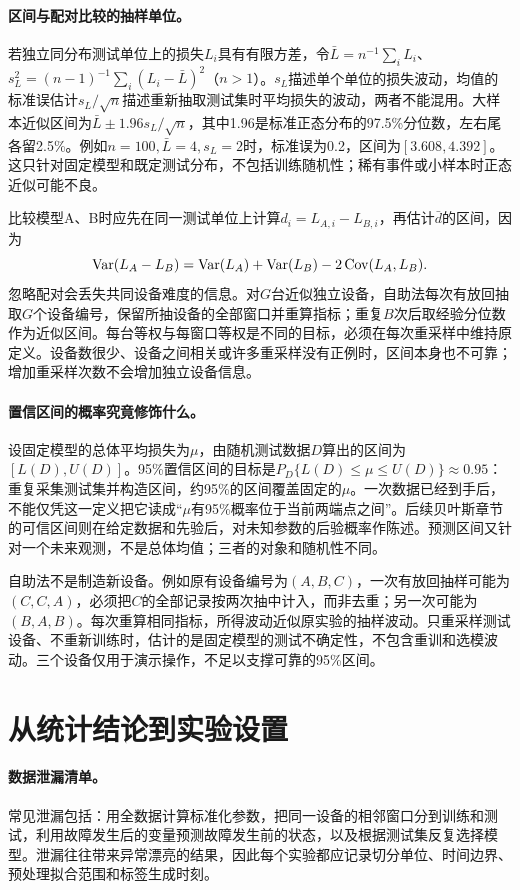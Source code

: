 \paragraph{区间与配对比较的抽样单位。}
若独立同分布测试单位上的损失$L_i$具有有限方差，令$\bar L=n^{-1}\sum_iL_i$、$s_L^2=(n-1)^{-1}\sum_i(L_i-\bar L)^2$（$n>1$）。$s_L$描述单个单位的损失波动，均值的标准误估计$s_L/\sqrt n$描述重新抽取测试集时平均损失的波动，两者不能混用。大样本近似区间为$\bar L\pm1.96s_L/\sqrt n$，其中1.96是标准正态分布的97.5\%分位数，左右尾各留2.5\%。例如$n=100,\bar L=4,s_L=2$时，标准误为0.2，区间为$[3.608,4.392]$。这只针对固定模型和既定测试分布，不包括训练随机性；稀有事件或小样本时正态近似可能不良。

比较模型A、B时应先在同一测试单位上计算$d_i=L_{A,i}-L_{B,i}$，再估计$\bar d$的区间，因为
\begin{equation}
 \operatorname{Var}(L_A-L_B)=\operatorname{Var}(L_A)+\operatorname{Var}(L_B)-2\operatorname{Cov}(L_A,L_B).
\end{equation}
忽略配对会丢失共同设备难度的信息。对$G$台近似独立设备，自助法每次有放回抽取$G$个设备编号，保留所抽设备的全部窗口并重算指标；重复$B$次后取经验分位数作为近似区间。每台等权与每窗口等权是不同的目标，必须在每次重采样中维持原定义。设备数很少、设备之间相关或许多重采样没有正例时，区间本身也不可靠；增加重采样次数不会增加独立设备信息。

\paragraph{置信区间的概率究竟修饰什么。}
设固定模型的总体平均损失为$\mu$，由随机测试数据$D$算出的区间为$[L(D),U(D)]$。95\%置信区间的目标是$P_D\{L(D)\leq\mu\leq U(D)\}\approx0.95$：重复采集测试集并构造区间，约95\%的区间覆盖固定的$\mu$。一次数据已经到手后，不能仅凭这一定义把它读成“$\mu$有95\%概率位于当前两端点之间”。后续贝叶斯章节的可信区间则在给定数据和先验后，对未知参数的后验概率作陈述。预测区间又针对一个未来观测，不是总体均值；三者的对象和随机性不同。

自助法不是制造新设备。例如原有设备编号为$(A,B,C)$，一次有放回抽样可能为$(C,C,A)$，必须把$C$的全部记录按两次抽中计入，而非去重；另一次可能为$(B,A,B)$。每次重算相同指标，所得波动近似原实验的抽样波动。只重采样测试设备、不重新训练时，估计的是固定模型的测试不确定性，不包含重训和选模波动。三个设备仅用于演示操作，不足以支撑可靠的95\%区间。

\section{从统计结论到实验设置}
\paragraph{数据泄漏清单。}
常见泄漏包括：用全数据计算标准化参数，把同一设备的相邻窗口分到训练和测试，利用故障发生后的变量预测故障发生前的状态，以及根据测试集反复选择模型。泄漏往往带来异常漂亮的结果，因此每个实验都应记录切分单位、时间边界、预处理拟合范围和标签生成时刻。

